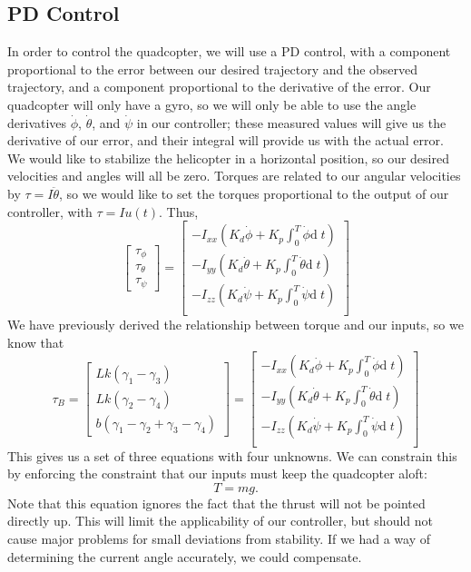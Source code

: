\documentclass{article}
\newcommand\bmatr[1]{\begin{bmatrix} #1\end{bmatrix}}
\newcommand\dd{\text{d}\;}
\begin{document}
\subsection*{PD Control}
In order to control the quadcopter, we will use a PD control, with a component proportional to the
error between our desired trajectory and the observed trajectory, and a component proportional to
the derivative of the error. Our quadcopter will only have a gyro, so we will only be able to use the
angle derivatives $\dot\phi$, $\dot\theta$, and $\dot\psi$ in our controller; these measured values
will give us the derivative of our error, and their integral will provide us with the actual error. We would like to
stabilize the helicopter in a horizontal position, so our desired velocities and angles will all be
zero. Torques are related to our angular velocities by $\tau = I\ddot\theta$, so we would like to set the torques proportional to the
output of our controller, with $\tau = I u(t)$. Thus,
\[\bmatr{\tau_\phi \\ \tau_\theta \\ \tau_\psi} = \bmatr{
    -I_{xx} \left( K_d\dot\phi + K_p \int_0^T \dot\phi \dd t \right) \\
    -I_{yy} \left( K_d\dot\theta + K_p \int_0^T \dot\theta \dd t \right) \\
    -I_{zz} \left( K_d\dot\psi + K_p \int_0^T \dot\psi \dd t \right) \\
}\]
We have previously derived the relationship between torque and our inputs, so we know that
\[\tau_B = \bmatr{
    Lk({\gamma_1} - {\gamma_3}) \\
    Lk({\gamma_2} - {\gamma_4}) \\
    b\left( {\gamma_1} -  {\gamma_2} +  {\gamma_3} -  {\gamma_4}\right)
} = \bmatr{
    -I_{xx} \left( K_d\dot\phi + K_p \int_0^T \dot\phi \dd t \right) \\
    -I_{yy} \left( K_d\dot\theta + K_p \int_0^T \dot\theta \dd t \right) \\
    -I_{zz} \left( K_d\dot\psi + K_p \int_0^T \dot\psi \dd t \right) \\
}\]
This gives us a set of three equations with four unknowns. We can constrain this by enforcing the
constraint that our inputs must keep the quadcopter aloft:
\[T = mg.\]
Note that this equation ignores the fact that the thrust will not be pointed directly up. This will limit
the applicability of our controller, but should not cause major problems for small deviations from
stability. If we had a way of determining the current angle accurately, we could compensate.
\end{document}
